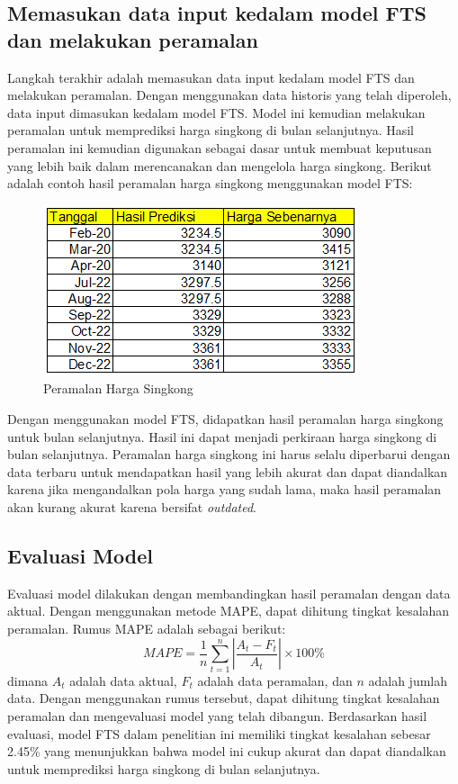 \documentclass[conference]{IEEEtran}
\begin{document}
\subsection{Memasukan data input kedalam model FTS dan melakukan peramalan}
Langkah terakhir adalah memasukan data input kedalam model FTS dan melakukan peramalan. Dengan menggunakan data historis yang telah diperoleh, data input dimasukan kedalam model FTS. Model ini kemudian melakukan peramalan untuk memprediksi harga singkong di bulan selanjutnya. Hasil peramalan ini kemudian digunakan sebagai dasar untuk membuat keputusan yang lebih baik dalam merencanakan dan mengelola harga singkong. Berikut adalah contoh hasil peramalan harga singkong menggunakan model FTS:
\begin{figure}[H]
    \centering
    \includegraphics[scale=0.5]{images/Peramalan.png} 
    \caption{Peramalan Harga Singkong}
\end{figure}
Dengan menggunakan model FTS, didapatkan hasil peramalan harga singkong untuk bulan selanjutnya. Hasil ini dapat menjadi perkiraan harga singkong di bulan selanjutnya. Peramalan harga singkong ini harus selalu diperbarui dengan data terbaru untuk mendapatkan hasil yang lebih akurat dan dapat diandalkan karena jika mengandalkan pola harga yang sudah lama, maka hasil peramalan akan kurang akurat karena bersifat \textit{outdated}.

\subsection{Evaluasi Model}
Evaluasi model dilakukan dengan membandingkan hasil peramalan dengan data aktual. Dengan menggunakan metode MAPE, dapat dihitung tingkat kesalahan peramalan. Rumus MAPE adalah sebagai berikut:
\begin{equation}
    MAPE = \frac{1}{n} \sum_{t=1}^{n} \left| \frac{A_t - F_t}{A_t} \right| \times 100\%
\end{equation}
dimana $A_t$ adalah data aktual, $F_t$ adalah data peramalan, dan $n$ adalah jumlah data. Dengan menggunakan rumus tersebut, dapat dihitung tingkat kesalahan peramalan dan mengevaluasi model yang telah dibangun. Berdasarkan hasil evaluasi, model FTS dalam penelitian ini memiliki tingkat kesalahan sebesar 2.45\% yang menunjukkan bahwa model ini cukup akurat dan dapat diandalkan untuk memprediksi harga singkong di bulan selanjutnya.
\end{document}
